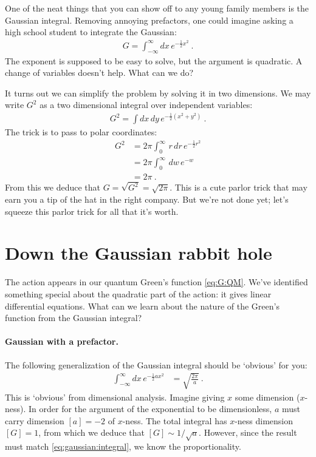 One of the neat things that you can show off to any young family members is the Gaussian integral. Removing annoying prefactors, one could imagine asking a high school student to integrate the Gaussian:
\begin{align}
	G = \int_{-\infty}^\infty dx\, e^{-\frac{1}{2}x^2} \ .
\end{align}
The exponent is supposed to be easy to solve, but the argument is quadratic. A change of variables doesn't help. What can we do?

It turns out we can simplify the problem by solving it in two dimensions. We may write $G^2$ as a two dimensional integral over independent variables:
\begin{align}
	G^2 = \int dx\, dy\, e^{-\frac{1}{2}(x^2 + y^2)} \ .
\end{align}
The trick is to pass to polar coordinates:
\begin{align}
	G^2 &= 2\pi \int_0^\infty\, r\,dr\, e^{-\frac{1}{2}r^2}
	\\
	&= 2\pi \int_0^\infty\, dw\, e^{-w}
	\\
	&= 2\pi \ . \label{eq:gaussian:integral}
\end{align}
From this we deduce that $G = \sqrt{G^2} = \sqrt{2\pi}$. This is a cute parlor trick that may earn you a tip of the hat in the right company. But we're not done yet; let's squeeze this parlor trick for all that it's worth.

\section{Down the Gaussian rabbit hole}

The action appears in our quantum Green's function \eqref{eq:G:QM}. We've identified something special about the quadratic part of the action: it gives linear differential equations. What can we learn about the nature of the Green's function from the Gaussian integral?

\paragraph{Gaussian with a prefactor.} The following generalization of the Gaussian integral should be `obvious' for you:
\begin{align}
	\int_{-\infty}^{\infty}dx\, e^{-\frac{1}{2}ax^2}
	&=
	\sqrt{\frac{2\pi}{a}} \ .
	\label{eq:gaussian:a}
\end{align}
This is `obvious' from dimensional analysis. Imagine giving $x$ some dimension ($x$-ness). In order for the argument of the exponential to be dimensionless, $a$ must carry dimension $[a]=-2$ of $x$-ness. The total integral has $x$-ness dimension $[G]=1$, from which we deduce that $[G]\sim 1/\sqrt{a}$. However, since the result must match \eqref{eq:gaussian:integral}, we know the proportionality.

